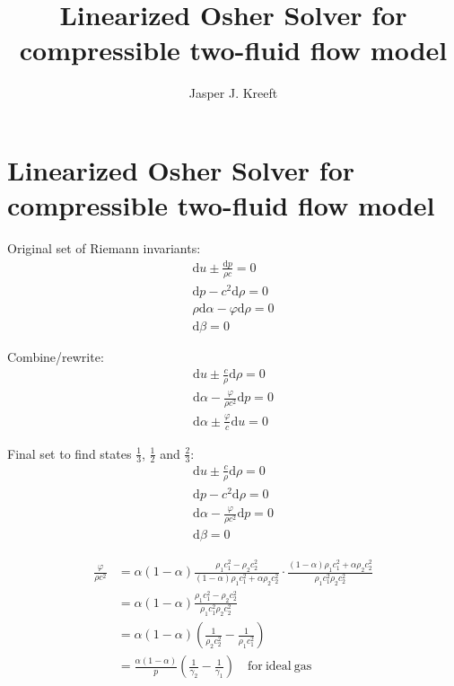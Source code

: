 \documentclass{article}
\title{Linearized Osher Solver for compressible two-fluid flow model}
\author{Jasper J. Kreeft}
\newcommand{\ud}{\mathrm{d}}
\begin{document}
\maketitle

\section{Linearized Osher Solver for compressible two-fluid flow model}

Original set of Riemann invariants:
\begin{subequations}
\begin{align}
\ud u\pm\frac{\ud p}{\rho c}=0\\
\ud p - c^2\ud\rho=0\\
\rho\ud\alpha-\varphi\ud\rho=0\\
\ud\beta=0
\end{align}
\end{subequations}

Combine/rewrite:
\begin{subequations}
\begin{align}
\ud u \pm\frac{c}{\rho}\ud\rho=0\\
\ud \alpha -\frac{\varphi}{\rho c^2}\ud p=0\\
\ud\alpha\pm\frac{\varphi}{c}\ud u=0
\end{align}
\end{subequations}

Final set to find states $\tfrac{1}{3}$, $\tfrac{1}{2}$ and $\tfrac{2}{3}$:
\begin{subequations}
\begin{align}
\ud u \pm\frac{c}{\rho}\ud\rho=0\\
\ud p - c^2\ud\rho=0\\
\ud \alpha -\frac{\varphi}{\rho c^2}\ud p=0\\
\ud\beta=0
\end{align}
\end{subequations}

\begin{displaymath}
\begin{split}
\frac{\varphi}{\rho c^2}&=\alpha(1-\alpha)\frac{\rho_1c_1^2-\rho_2c_2^2}{(1-\alpha)\rho_1c_1^2+\alpha\rho_2c_2^2}\cdot \frac{(1-\alpha)\rho_1c_1^2+\alpha\rho_2c_2^2}{\rho_1c_1^2\rho_2c_2^2}\\
&=\alpha(1-\alpha)\frac{\rho_1c_1^2-\rho_2c_2^2}{\rho_1c_1^2\rho_2c_2^2}\\
&=\alpha(1-\alpha)\left(\frac{1}{\rho_2c_2^2}-\frac{1}{\rho_1c_1^2}\right)\\
&=\frac{\alpha(1-\alpha)}{p}\left(\frac{1}{\gamma_2}-\frac{1}{\gamma_1}\right)\quad\mathrm{for}\ \mathrm{ideal}\ \mathrm{gas}
\end{split}
\end{displaymath}
\end{document}
